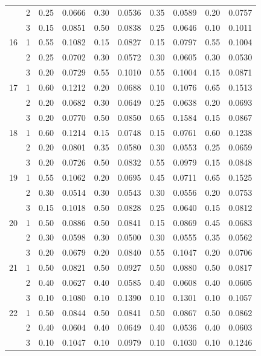 \begin{longtable}{llcccccccc}
   & 2 & 0.25 & 0.0666 & 0.30 & 0.0536 & 0.35 & 0.0589 & 0.20 & 0.0757 \\ 
   & 3 & 0.15 & 0.0851 & 0.50 & 0.0838 & 0.25 & 0.0646 & 0.10 & 0.1011 \\ 
  16 & 1 & 0.55 & 0.1082 & 0.15 & 0.0827 & 0.15 & 0.0797 & 0.55 & 0.1004 \\ 
   & 2 & 0.25 & 0.0702 & 0.30 & 0.0572 & 0.30 & 0.0605 & 0.30 & 0.0530 \\ 
   & 3 & 0.20 & 0.0729 & 0.55 & 0.1010 & 0.55 & 0.1004 & 0.15 & 0.0871 \\ 
  17 & 1 & 0.60 & 0.1212 & 0.20 & 0.0688 & 0.10 & 0.1076 & 0.65 & 0.1513 \\ 
   & 2 & 0.20 & 0.0682 & 0.30 & 0.0649 & 0.25 & 0.0638 & 0.20 & 0.0693 \\ 
   & 3 & 0.20 & 0.0770 & 0.50 & 0.0850 & 0.65 & 0.1584 & 0.15 & 0.0867 \\ 
  18 & 1 & 0.60 & 0.1214 & 0.15 & 0.0748 & 0.15 & 0.0761 & 0.60 & 0.1238 \\ 
   & 2 & 0.20 & 0.0801 & 0.35 & 0.0580 & 0.30 & 0.0553 & 0.25 & 0.0659 \\ 
   & 3 & 0.20 & 0.0726 & 0.50 & 0.0832 & 0.55 & 0.0979 & 0.15 & 0.0848 \\ 
  19 & 1 & 0.55 & 0.1062 & 0.20 & 0.0695 & 0.45 & 0.0711 & 0.65 & 0.1525 \\ 
   & 2 & 0.30 & 0.0514 & 0.30 & 0.0543 & 0.30 & 0.0556 & 0.20 & 0.0753 \\ 
   & 3 & 0.15 & 0.1018 & 0.50 & 0.0828 & 0.25 & 0.0640 & 0.15 & 0.0812 \\ 
  20 & 1 & 0.50 & 0.0886 & 0.50 & 0.0841 & 0.15 & 0.0869 & 0.45 & 0.0683 \\ 
   & 2 & 0.30 & 0.0598 & 0.30 & 0.0500 & 0.30 & 0.0555 & 0.35 & 0.0562 \\ 
   & 3 & 0.20 & 0.0679 & 0.20 & 0.0840 & 0.55 & 0.1047 & 0.20 & 0.0706 \\ 
  21 & 1 & 0.50 & 0.0821 & 0.50 & 0.0927 & 0.50 & 0.0880 & 0.50 & 0.0817 \\ 
   & 2 & 0.40 & 0.0627 & 0.40 & 0.0585 & 0.40 & 0.0608 & 0.40 & 0.0605 \\ 
   & 3 & 0.10 & 0.1080 & 0.10 & 0.1390 & 0.10 & 0.1301 & 0.10 & 0.1057 \\ 
  22 & 1 & 0.50 & 0.0844 & 0.50 & 0.0841 & 0.50 & 0.0867 & 0.50 & 0.0862 \\ 
   & 2 & 0.40 & 0.0604 & 0.40 & 0.0649 & 0.40 & 0.0536 & 0.40 & 0.0603 \\ 
   & 3 & 0.10 & 0.1047 & 0.10 & 0.0979 & 0.10 & 0.1030 & 0.10 & 0.1246 \\ 

\end{longtable}
